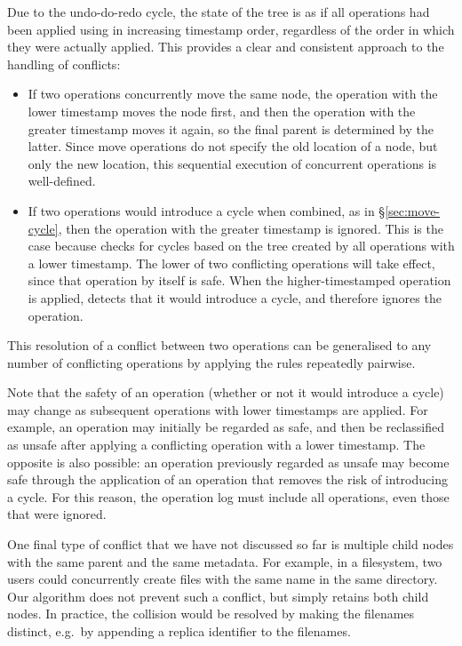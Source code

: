 \documentclass[10pt,journal,compsoc]{IEEEtran}
\begin{document}
Due to the undo-do-redo cycle, the state of the tree is as if all operations had been applied using  in increasing timestamp order, regardless of the order in which they were actually applied.
This provides a clear and consistent approach to the handling of conflicts:
\begin{itemize}
    \item If two operations concurrently move the same node, the operation with the lower timestamp moves the node first, and then the operation with the greater timestamp moves it again, so the final parent is determined by the latter.
        Since move operations do not specify the old location of a node, but only the new location, this sequential execution of concurrent operations is well-defined.
    \item If two operations would introduce a cycle when combined, as in \S\ref{sec:move-cycle}, then the operation with the greater timestamp is ignored.
        This is the case because  checks for cycles based on the tree created by all operations with a lower timestamp.
        The lower of two conflicting operations will take effect, since that operation by itself is safe.
        When the higher-timestamped operation is applied,  detects that it would introduce a cycle, and therefore ignores the operation.
\end{itemize}

This resolution of a conflict between two operations can be generalised to any number of conflicting operations by applying the rules repeatedly pairwise.

Note that the safety of an operation (whether or not it would introduce a cycle) may change as subsequent operations with lower timestamps are applied.
For example, an operation may initially be regarded as safe, and then be reclassified as unsafe after applying a conflicting operation with a lower timestamp.
The opposite is also possible: an operation previously regarded as unsafe may become safe through the application of an operation that removes the risk of introducing a cycle.
For this reason, the operation log must include all operations, even those that were ignored.

One final type of conflict that we have not discussed so far is multiple child nodes with the same parent and the same metadata.
For example, in a filesystem, two users could concurrently create files with the same name in the same directory.
Our algorithm does not prevent such a conflict, but simply retains both child nodes.
In practice, the collision would be resolved by making the filenames distinct, e.g.\ by appending a replica identifier to the filenames.
\end{document}
